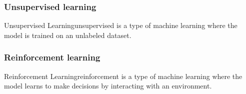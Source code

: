     \subsubsection*{Unsupervised learning}
    \begin{dfnbox}{Unsupervised Learning}{unsupervised}
         is a type of machine learning where the model is trained on an unlabeled dataset.
    \end{dfnbox}

    \subsubsection*{Reinforcement learning}
    \begin{dfnbox}{Reinforcement Learning}{reinforcement}
         is a type of machine learning where the model learns to make decisions by interacting with an environment.
    \end{dfnbox}